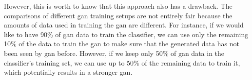 However, this is worth to know that this approach also has a drawback. The comparisons of
different \acrshort{gan} training setups are not entirely fair because the amounts of data
used in training the \acrshort{gan} are different. For instance, if we would like to have
90\% of \acrshort{gan} data to train the classifier, we can use only the remaining 10\% of
the data to train the \acrshort{gan} to make sure that the generated data has not been
seen by \acrshort{gan} before. However, if we keep only 50\% of \acrshort{gan} data in the
classifier's training set, we can use up to 50\% of the remaining data to train it, which
potentially results in a stronger \acrshort{gan}. 
